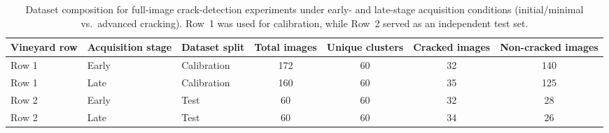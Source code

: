 \begin{table}[htbp]
\centering
\caption[Full-image dataset: early- and late-stage composition]{Dataset composition for full-image crack-detection experiments under early- and late-stage acquisition conditions (initial/minimal vs.\ advanced cracking). Row~1 was used for calibration, while Row~2 served as an independent test set.}
\label{tab:full_image_dataset_composition}

\small
\renewcommand{\arraystretch}{1.2}
\setlength{\tabcolsep}{6pt}

\begin{adjustbox}{max width=\textwidth,center}
\begin{tabular}{@{}lllcccc@{}}
\toprule
Vineyard row & Acquisition stage & Dataset split & Total images & Unique clusters & Cracked images & Non-cracked images \\
\midrule
Row 1 & Early & Calibration & 172 & 60 & 32 & 140 \\
Row 1 & Late  & Calibration & 160 & 60 & 35 & 125 \\
\addlinespace[4pt]
Row 2 & Early & Test        & 60  & 60 & 32 & 28  \\
Row 2 & Late  & Test        & 60  & 60 & 34 & 26  \\
\bottomrule
\end{tabular}
\end{adjustbox}

\end{table}

